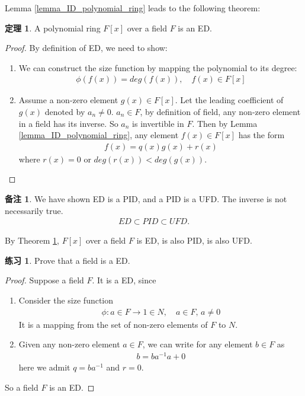 \documentclass[utf8]{ctexbook}
\theoremstyle{definition}
\newtheorem{prototheorem}{定理}[section]
\newenvironment{theorem}
   {\colorlet{shadecolor}{pink!30}\begin{shaded}\begin{prototheorem}}
   {\end{prototheorem}\end{shaded}}
\newtheorem{memo}{备注}[section]
\newtheorem{exercise}{练习}[section]
\begin{document}
Lemma \ref{lemma_ID_polynomial_ring} leads to the following theorem:

\begin{theorem}
\label{theorem_Polynomial_ring_over_field_is_ED}
A polynomial ring $F[x]$ over a field $F$ is an ED.
\end{theorem}

\begin{proof}
By definition of ED, we need to show:
\begin{enumerate}
\item{We can construct the size function by mapping the polynomial to its degree:
\begin{align*}
\phi(f(x)) = deg(f(x)), \quad f(x) \in F[x]
\end{align*}
}
\item{
Assume a non-zero element $g(x) \in F[x]$. Let the leading coefficient of $g(x)$ denoted by $a_n \neq 0$. $a_n \in F$, by definition of field, any non-zero element in a field has its inverse. So $a_n$ is invertible in $F$. Then by Lemma \ref{lemma_ID_polynomial_ring}, any element $f(x) \in F[x]$ has the form
\begin{align*}
f(x) = q(x) g(x) + r(x)
\end{align*}
where $r(x) = 0$ or $deg(r(x)) < deg(g(x))$.
}
\end{enumerate}

\end{proof}

\begin{memo}
We have shown ED is a PID, and a PID is a UFD. The inverse is not necessarily true.
\begin{align*}
ED \subset PID \subset UFD .
\end{align*}

By Theorem \ref{theorem_Polynomial_ring_over_field_is_ED}, $F[x]$ over a field $F$ is ED, is also PID, is also UFD.

\end{memo}

\begin{exercise}
Prove that a field is a ED.
\end{exercise}

\begin{proof}
Suppose a field $F$. It is a ED, since
\begin{enumerate}
\item{
Consider the size function
\begin{align*}
\phi: a \in F \longrightarrow 1 \in N, \quad a \in F, \, a \neq 0
\end{align*}
It is a mapping from the set of non-zero elements of $F$ to $N$.
}
\item{
Given any non-zero element $a \in F$, we can write for any element $b \in F$ as
\begin{align*}
b = b a^{-1} a + 0
\end{align*}
here we admit $q = b a^{-1}$ and $r=0$.
}
\end{enumerate}

So a field $F$ is an ED.
\end{proof}
\end{document}
